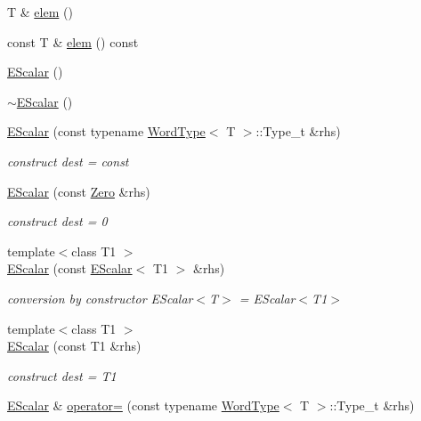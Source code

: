 \begin{DoxyCompactItemize}
\item 
T \& \mbox{\hyperlink{classENSEM_1_1EScalar_a8de3b840367731efc862fc6943119152}{elem}} ()
\item 
const T \& \mbox{\hyperlink{classENSEM_1_1EScalar_ab3fb9173e700cc3e0bf94ffcb9d04c29}{elem}} () const
\item 
\mbox{\hyperlink{classENSEM_1_1EScalar_ad4290141b2f7d43b6652d8ef95dfdbf5}{E\+Scalar}} ()
\item 
\mbox{\hyperlink{classENSEM_1_1EScalar_addb090b46c2b6abdff79eb52bad58091}{$\sim$\+E\+Scalar}} ()
\item 
\mbox{\hyperlink{classENSEM_1_1EScalar_ad064adaa15e67106893182ba57c6fd91}{E\+Scalar}} (const typename \mbox{\hyperlink{structENSEM_1_1WordType}{Word\+Type}}$<$ T $>$\+::Type\+\_\+t \&rhs)
\begin{DoxyCompactList}\small\item\em construct dest = const \end{DoxyCompactList}\item 
\mbox{\hyperlink{classENSEM_1_1EScalar_aa50915f887b0e206aecad55b2f25e4de}{E\+Scalar}} (const \mbox{\hyperlink{structENSEM_1_1Zero}{Zero}} \&rhs)
\begin{DoxyCompactList}\small\item\em construct dest = 0 \end{DoxyCompactList}\item 
{\footnotesize template$<$class T1 $>$ }\\\mbox{\hyperlink{classENSEM_1_1EScalar_a62e800e98a28c98a6d297eb613e86f82}{E\+Scalar}} (const \mbox{\hyperlink{classENSEM_1_1EScalar}{E\+Scalar}}$<$ T1 $>$ \&rhs)
\begin{DoxyCompactList}\small\item\em conversion by constructor E\+Scalar$<$\+T$>$ = E\+Scalar$<$\+T1$>$ \end{DoxyCompactList}\item 
{\footnotesize template$<$class T1 $>$ }\\\mbox{\hyperlink{classENSEM_1_1EScalar_a1436a0e5b8bf00083caf1540f4fc9397}{E\+Scalar}} (const T1 \&rhs)
\begin{DoxyCompactList}\small\item\em construct dest = T1 \end{DoxyCompactList}\item 
\mbox{\hyperlink{classENSEM_1_1EScalar}{E\+Scalar}} \& \mbox{\hyperlink{classENSEM_1_1EScalar_a01ae8ddc1b0d0e4ecd65f5de624faee5}{operator=}} (const typename \mbox{\hyperlink{structENSEM_1_1WordType}{Word\+Type}}$<$ T $>$\+::Type\+\_\+t \&rhs)

\end{DoxyCompactItemize}
